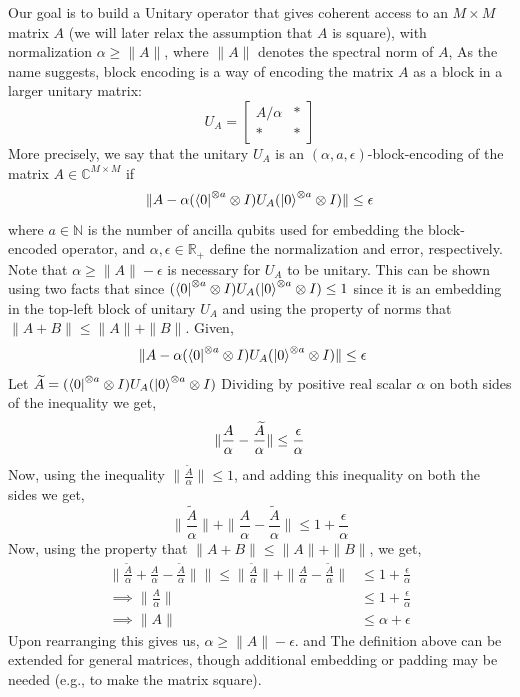 \documentclass[12pt, oneside]{book}
\theoremstyle{definition}
\theoremstyle{definition}
\theoremstyle{remark}
\begin{document}
Our goal is to build a Unitary operator that gives coherent access to an $M \times M$ matrix $A$ (we will later relax the assumption that $A$ is square), with normalization $\alpha\geq \|A\|$, where $\|A\|$ denotes the spectral norm of $A$, As the name suggests, block encoding is a way of encoding the matrix $A$ as a block in a larger unitary matrix:
\[
U_A = \begin{bmatrix} A/\alpha & * \\ * & * \end{bmatrix}
\]
More precisely, we say that the unitary $U_A$ is an $(\alpha,a,\epsilon)$-block-encoding of the matrix $A\in \mathbb{C}^{M\times M}$ if
\[
\|A-\alpha(\bra{0}^{\otimes a}\otimes I)U_A(\ket{0}^{\otimes a}\otimes I)\|\leq \epsilon
\]
where $a\in\mathbb{N}$ is the number of ancilla qubits used for embedding the block-encoded operator, and $\alpha,\epsilon\in\mathbb{R}_{+}$ define the normalization and error, respectively. Note that $\alpha\geq \|A\|-\epsilon$ is necessary for $U_A$ to be unitary. This can be shown using two facts that since $(\bra{0}^{\otimes a}\otimes I)U_A(\ket{0}^{\otimes a}\otimes I)\leq 1$ since it is an embedding in the top-left block of unitary $U_A$ and using the property of norms that $\|A+B\|\leq\|A\|+\|B\|$. Given,
\begin{align*}
    \|A-\alpha (\bra{0}^{\otimes a}\otimes I)U_A(\ket{0}^{\otimes a}\otimes I)\| &\leq \epsilon
\end{align*}
Let $\widetilde{A} =(\bra{0}^{\otimes a}\otimes I)U_A(\ket{0}^{\otimes a}\otimes I)$ Dividing by positive real scalar $\alpha$ on both sides of the inequality we get,
\[
    \|\frac{A}{\alpha} - \frac{\widetilde{A}}{\alpha}\|\leq \frac{\epsilon}{\alpha}\\
\]
Now, using the inequality $\|\frac{\widetilde{A}}{\alpha}\|\leq 1$, and adding this inequality on both the sides we get,
\[
\|\frac{\widetilde{A}}{\alpha}\|+\|\frac{A}{\alpha} - \frac{\widetilde{A}}{\alpha}\|\leq 1+\frac{\epsilon}{\alpha}
\]
Now, using the property that $\|A+B\|\leq \|A\|+\|B\|$, we get,
\begin{align*}
\|\frac{\widetilde{A}}{\alpha}+\frac{A}{\alpha} - \frac{\widetilde{A}}{\alpha}\|\|\leq \|\frac{\widetilde{A}}{\alpha}\|+\|\frac{A}{\alpha} - \frac{\widetilde{A}}{\alpha}\| &\leq 1+\frac{\epsilon}{\alpha}\\
\implies \|\frac{A}{\alpha}\|&\leq 1+\frac{\epsilon}{\alpha}\\
\implies \|A\|&\leq \alpha + \epsilon
\end{align*}
Upon rearranging this gives us, $\alpha \geq \|A\|-\epsilon$.
and The definition above can be extended for general matrices, though additional embedding or padding may be needed (e.g., to make the matrix square).
\end{document}
